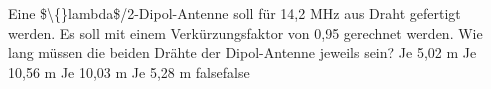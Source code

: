     {Eine \$\textbackslash\{\}lambda\$/2-Dipol-Antenne soll für 14,2 MHz aus Draht gefertigt werden. Es soll mit einem Verkürzungsfaktor von 0,95 gerechnet werden. Wie lang müssen die beiden Drähte der Dipol-Antenne jeweils sein?}
    {Je 5,02 m}
    {Je 10,56 m}
    {Je 10,03 m}
    {Je 5,28 m}
    {false}{false}